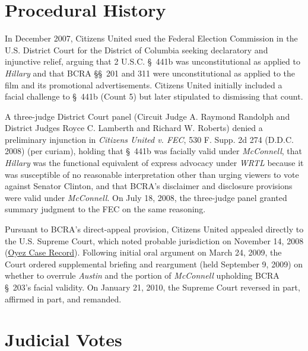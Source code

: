 \documentclass[12pt]{article}
\begin{document}
\section{Procedural History}

In December 2007, Citizens United sued the Federal Election Commission in the U.S. District Court for the District of Columbia seeking declaratory and injunctive relief, arguing that 2 U.S.C. \S~441b was unconstitutional as applied to \textit{Hillary} and that BCRA \S\S~201 and 311 were unconstitutional as applied to the film and its promotional advertisements. Citizens United initially included a facial challenge to \S~441b (Count 5) but later stipulated to dismissing that count.

A three-judge District Court panel (Circuit Judge A. Raymond Randolph and District Judges Royce C. Lamberth and Richard W. Roberts) denied a preliminary injunction in \textit{Citizens United v. FEC}, 530 F. Supp. 2d 274 (D.D.C. 2008) (per curiam), holding that \S~441b was facially valid under \textit{McConnell}, that \textit{Hillary} was the functional equivalent of express advocacy under \textit{WRTL} because it was susceptible of no reasonable interpretation other than urging viewers to vote against Senator Clinton, and that BCRA's disclaimer and disclosure provisions were valid under \textit{McConnell}. On July 18, 2008, the three-judge panel granted summary judgment to the FEC on the same reasoning.

Pursuant to BCRA's direct-appeal provision, Citizens United appealed directly to the U.S. Supreme Court, which noted probable jurisdiction on November 14, 2008 (\href{https://www.oyez.org/cases/2008/08-205}{Oyez Case Record}). Following initial oral argument on March 24, 2009, the Court ordered supplemental briefing and reargument (held September 9, 2009) on whether to overrule \textit{Austin} and the portion of \textit{McConnell} upholding BCRA \S~203's facial validity. On January 21, 2010, the Supreme Court reversed in part, affirmed in part, and remanded.

\section{Judicial Votes}
\end{document}
